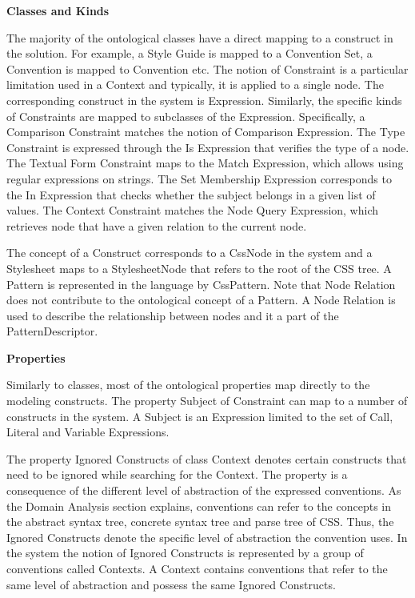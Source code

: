 \documentclass[parskip=full]{uvamscse}
\begin{document}
\textbf{Classes and Kinds}

The majority of the ontological classes have a direct mapping to a construct in the solution. For
example, a Style Guide is mapped to a Convention Set, a Convention is mapped to Convention etc. The
notion of Constraint is a particular limitation used in a Context and typically, it is applied to a
single node. The corresponding construct in the system is Expression. Similarly, the specific kinds
of Constraints are mapped to subclasses of the Expression. Specifically, a Comparison Constraint
matches the notion of Comparison Expression. The Type Constraint is expressed through the Is
Expression that verifies the type of a node. The Textual Form Constraint maps to the Match
Expression, which allows using regular expressions on strings. The Set Membership Expression
corresponds to the In Expression that checks whether the subject belongs in a given list of values.
The Context Constraint matches the Node Query Expression, which retrieves node that have a given
relation to the current node.

The concept of a Construct corresponds to a CssNode in the system and a Stylesheet maps to a
StylesheetNode that refers to the root of the CSS tree. A Pattern is represented in the language by
CssPattern. Note that Node Relation does not contribute to the ontological concept of a Pattern.
A Node Relation is used to describe the relationship between nodes and it a part of the PatternDescriptor.

\textbf{Properties}

Similarly to classes, most of the ontological properties map directly to the modeling constructs.
The property Subject of Constraint can map to a number of constructs in the system. A Subject is an
Expression limited to the set of Call, Literal and Variable Expressions.

The property Ignored Constructs of class Context denotes certain constructs that need to be ignored
while searching for the Context. The property is a consequence of the different level of abstraction
of the expressed conventions. As the Domain Analysis section explains, conventions can refer to the
concepts in the abstract syntax tree, concrete syntax tree and parse tree of CSS. Thus, the Ignored
Constructs denote the specific level of abstraction the convention uses. In the system the notion of
Ignored Constructs is represented by a group of conventions called Contexts. A Context contains
conventions that refer to the same level of abstraction and possess the same Ignored Constructs.
\end{document}
